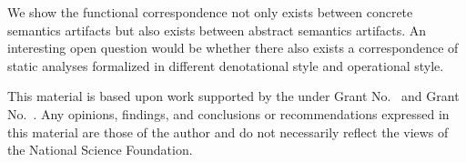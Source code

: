 \documentclass[acmsmall, review]{acmart}\settopmatter{}
\begin{document}
We show the functional correspondence not only exists between concrete semantics artifacts
but also exists between abstract semantics artifacts. An interesting open question would
be whether there also exists a correspondence of static analyses formalized in different 
denotational style and operational style.

\begin{acks}                            %
  This material is based upon work supported by the
   under Grant
  No.~ and Grant
  No.~.  Any opinions, findings, and
  conclusions or recommendations expressed in this material are those
  of the author and do not necessarily reflect the views of the
  National Science Foundation.
\end{acks}




\end{document}
